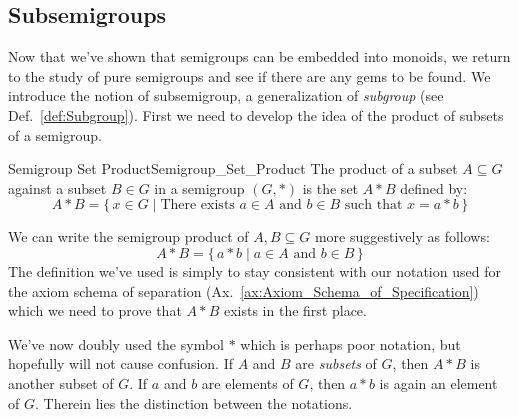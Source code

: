     \subsection{Subsemigroups}
        Now that we've shown that semigroups can be embedded into monoids, we
        return to the study of pure semigroups and see if there are any gems to
        be found. We introduce the notion of subsemigroup, a generalization of
        \textit{subgroup} (see Def.~\ref{def:Subgroup}). First we need to
        develop the idea of the product of subsets of a semigroup.
        \begin{fdefinition}{Semigroup Set Product}{Semigroup_Set_Product}
            The product of a subset $A\subseteq{G}$ against a subset $B\in{G}$
            in a semigroup $(G,*)$ is the set $A*B$ defined by:
            \begin{equation*}
                A*B=\{\,x\in{G}\;|\;\textrm{There exists }a\in{A}
                    \textrm{ and }b\in{B}\textrm{ such that }x=a*b\,\}
            \end{equation*}
        \end{fdefinition}
        We can write the semigroup product of $A,B\subseteq{G}$ more
        suggestively as follows:
        \begin{equation}
            A*B=\{\,a*b\;|\;a\in{A}\textrm{ and }b\in{B}\,\}
        \end{equation}
        The definition we've used is simply to stay consistent with our notation
        used for the axiom schema of separation
        (Ax.~\ref{ax:Axiom_Schema_of_Specification}) which we need to prove that
        $A*B$ exists in the first place.
        \par\hfill\par
        We've now doubly used the symbol $*$ which is perhaps poor notation, but
        hopefully will not cause confusion. If $A$ and $B$ are \textit{subsets}
        of $G$, then $A*B$ is another subset of $G$. If $a$ and $b$ are elements
        of $G$, then $a*b$ is again an element of $G$. Therein lies the
        distinction between the notations.
